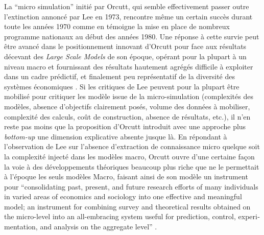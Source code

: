 La \enquote{micro simulation} initié par Orcutt, qui semble effectivement passer outre l'extinction annoncé par Lee en 1973, rencontre même un certain succès durant toute les années 1970 comme en témoigne la mise en place de nombreux programme nationaux au début des années 1980. \autocite{Baroni2007} Une réponse à cette survie peut être avancé dans le positionnement innovant d'Orcutt pour face aux résultats décevant des \textit{Large Scale Models} de son époque, opérant pour la plupart à un niveau macro et fournissant des résultats hautement agrégés difficile à exploiter dans un cadre prédictif, et finalement peu représentatif de la diversité des systèmes économiques \autocite{Birkin2012} \autocite{Baroni2007}. Si les critiques de Lee peuvent pour la plupart être mobilisé pour critiquer les modèle issue de la micro-simulation (complexités des modèles, absence d'objectifs clairement posés, volume des données à mobiliser, complexité des calculs, coût de construction, absence de résultats, etc.), il n'en reste pas moins que la proposition d'Orcutt introduit avec une approche plus \textit{bottom-up} une dimension explicative absente jusque là. En répondant à l'observation de Lee sur l'absence d'extraction de connaissance micro quelque soit la complexité injecté dans les modèles macro, Orcutt ouvre d'une certaine façon la voie à des développements théoriques beaucoup plus riche que ne le permettait à l'époque les seuls modèles Macro, faisant ainsi de son modèle un instrument pour \foreignquote{english}{consolidating past, present, and future research efforts of many individuals in varied areas of economics and sociology into one effective and meaningful model; an instrument for combining survey and theoretical results obtained on the micro-level into an all-embracing system useful for prediction, control, experimentation, and analysis on the aggregate level} \autocite[122]{Cohen1961}.

